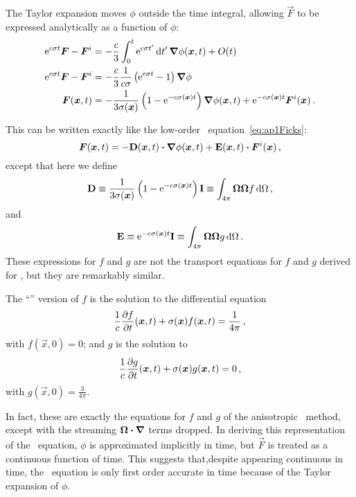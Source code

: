 The Taylor expansion moves $\phi$ outside the time integral, allowing
$\vec{F}$ to be expressed analytically as a function of $\phi$:
\begin{align*}
  \mathop{}\!\mathrm{e}^{c \sigma t} \bm{F} - \bm{F}^i
  &= - \frac{c}{3} \int_0^{t} \mathop{}\!\mathrm{e}^{c \sigma t'} \mathop{}\!\mathrm{d} t'\, \bm{\nabla} \phi(\bm{x}, t)
  + O(t)
  \\
  \mathop{}\!\mathrm{e}^{c \sigma t} \bm{F} - \bm{F}^i
  &= - \frac{c}{3} \frac{1}{c \sigma}  \left( \mathop{}\!\mathrm{e}^{c \sigma t} - 1 \right) \bm{\nabla} \phi
  \\
  \bm{F}(\bm{x},t)
  &= - \frac{1}{3\sigma(\bm{x})}
  \left(1 - \mathop{}\!\mathrm{e}^{-c \sigma(\bm{x}) t} \right) \bm{\nabla} \phi(\bm{x}, t)
  + \mathop{}\!\mathrm{e}^{-c \sigma(\bm{x}) t} \bm{F}^i(\bm{x}) \,.
\end{align*}

This can be written exactly like the low-order \APone\
equation~\eqref{eq:ap1Ficks}:
\begin{equation*}
  \bm{F}(\bm{x}, t)
= - \mathbf{D}(\bm{x},t) \bm{\cdot} \bm{\nabla} \phi(\bm{x},t)
  + \mathbf{E}(\bm{x},t) \bm{\cdot} \bm{F}^i(\bm{x})\,,
\end{equation*}
except that here we define
\begin{equation*}
  \mathbf{D} \equiv
  \frac{1}{3\sigma(\bm{x})} \left(1 - \mathop{}\!\mathrm{e}^{-c \sigma(\bm{x}) t} \right)
  \mathbf{I}
  \equiv \int_{4\pi} \bm{\Omega}\bm{\Omega} f \mathop{}\!\mathrm{d} \Omega \,,
\end{equation*}
and
\begin{equation*}
  \mathbf{E} \equiv
  \mathop{}\!\mathrm{e}^{-c \sigma(\bm{x}) t} \mathbf{I}
  \equiv \int_{4\pi} \bm{\Omega}\bm{\Omega} g \mathop{}\!\mathrm{d} \Omega \,.
\end{equation*}
These expressions for $f$ and $g$ are not the transport equations for $f$ and
$g$ derived for \APone, but they are remarkably similar.

The ``\Pone'' version of $f$ is the solution to the differential equation
\begin{equation*}
  \frac{1}{c} \frac{\partial f}{\partial t}(\bm{x},t) + \sigma(\bm{x}) f(\bm{x},t) =
  \frac{1}{4\pi}\,,
\end{equation*}
with $f(\vec{x},0)=0$; and $g$ is the solution to
\begin{equation*}
  \frac{1}{c} \frac{\partial g}{\partial t}(\bm{x},t) + \sigma(\bm{x}) g(\bm{x},t) = 0\,,
\end{equation*}
with $g(\vec{x},0)=\frac{3}{4\pi}$.

In fact, these are exactly the equations for $f$ and $g$ of the anisotropic
\Pone\ method, except with the streaming $\bm{\Omega}\bm{\cdot} \bm{\nabla}$ terms dropped.
In deriving this representation of the \Pone\ equation, $\phi$ is approximated 
implicitly in time, but $\vec{F}$ is treated as a continuous function of time.
This suggests that,despite appearing continuous in time, the \APone\ equation is 
only first order accurate in time because of the Taylor expansion of $\phi$.

